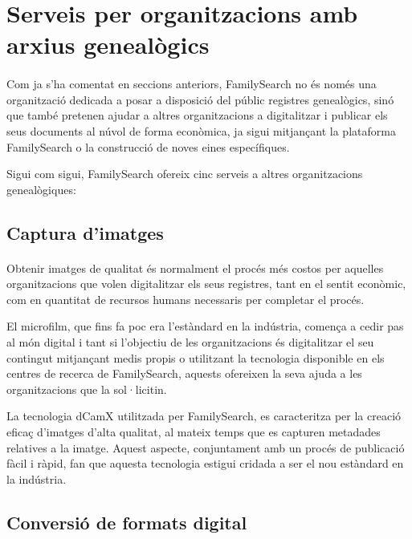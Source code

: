 \section{Serveis per organitzacions amb arxius genealògics}

    \paragraph{}
    Com ja s’ha comentat en seccions anteriors, FamilySearch no és només una or\-ga\-nit\-za\-ció dedicada a posar a disposició del públic registres genealògics, sinó que també pretenen ajudar a altres organitzacions a digitalitzar i publicar els seus documents al núvol de forma econòmica, ja sigui mitjançant la plataforma FamilySearch o la construcció de noves eines específiques.

    Sigui com sigui, FamilySearch ofereix cinc serveis a altres organitzacions genealògiques:

    \subsection{Captura d'imatges}

    \paragraph{}
    Obtenir imatges de qualitat és normalment el procés més costos per aquelles organitzacions que volen digitalitzar els seus registres, tant en el sentit econòmic, com en quantitat de recursos humans necessaris per completar el procés.

    El microfilm, que fins fa poc era l’estàndard en la indústria, comença a cedir pas al món digital i tant si l’objectiu de les organitzacions és digitalitzar el seu contingut mitjançant medis propis o utilitzant la tecnologia disponible en els centres de recerca de FamilySearch, aquests ofereixen la seva ajuda a les organitzacions que la sol·licitin.

    La tecnologia dCamX utilitzada per FamilySearch, es caracteritza per la creació eficaç d'imatges d’alta qualitat, al mateix temps que es capturen metadades relatives a la imatge. Aquest aspecte, conjuntament amb un procés de publicació fàcil i ràpid, fan que aquesta tecnologia estigui cridada a ser el nou estàndard en la indústria.


    \subsection{Conversió de formats digital}

